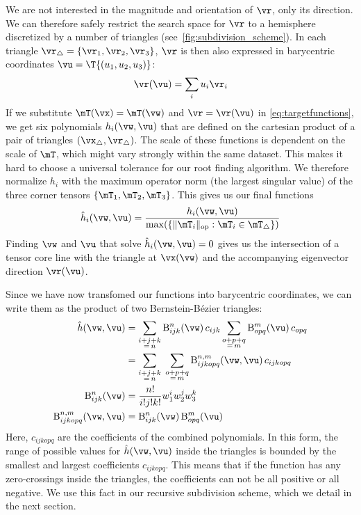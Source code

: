 %
We are not interested in the magnitude and orientation of $\vr$, only its
direction.
%
We can therefore safely restrict the search space for $\vr$ to a hemisphere
discretized by a number of triangles (see~\cref{fig:subdivision_scheme}).
%
In each triangle $\vr_\triangle = \{\vr_1, \vr_2, \vr_3\}$, $\vr$ is then also
expressed in barycentric coordinates $\vu = \T{(u_1, u_2, u_3)}$:
%
\begin{equation}
  \vr(\vu) = \sum_i u_i \vr_i
\end{equation}
%
If we substitute $\mT(\vx) = \mT(\vw)$ and $\vr = \vr(\vu)$ in
\eqref{eq:targetfunctions}, we get six polynomials $h_i(\vw, \vu)$
that are defined on the cartesian product of a pair of triangles
$(\vx_\triangle, \vr_\triangle)$.
%
The scale of these functions is dependent on the scale of $\mT$, which might
vary strongly within the same dataset.
%
This makes it hard to choose a universal tolerance for our root finding
algorithm.
%
We therefore normalize $h_i$ with the maximum operator norm (the largest
singular value) of the three corner tensors $\{\mT_1, \mT_2, \mT_3\}$.
%
This gives us our final functions
%
\begin{equation}
  \hat{h}_i(\vw, \vu) = \frac{h_i(\vw, \vu)}
      {\max(\{\|\mT_i\|_{\mathrm{op}} : \mT_i \in \mT_\triangle\})}
\end{equation}
%
Finding $\vw$ and $\vu$ that solve $\hat{h}_i(\vw, \vu) = 0$ gives us the
intersection of a tensor core line with the triangle at $\vx(\vw)$ and the
accompanying eigenvector direction $\vr(\vu)$.
%

%
Since we have now transfomed our functions into barycentric coordinates, we can
write them as the product of two Bernstein-B\'ezier triangles:
%
\begin{align}
\hat{h}(\vw, \vu) &= \sum_{\substack{i+j+k\\=\,n}} \mathrm{B}_{ijk}^n(\vw)\, c_{ijk}
                \sum_{\substack{o+p+q\\=\,m}} \mathrm{B}_{opq}^m(\vu)\, c_{opq} \\
            &= \sum_{\substack{i+j+k\\=\,n}} \; \sum_{\substack{o+p+q\\=\,m}}
              \mathrm{B}_{ijkopq}^{n, m}(\vw, \vu)\, c_{ijkopq} \\
\mathrm{B}_{ijk}^n(\vw) &= \frac{n!}{i!j!k!} w_1^i w_2^j w_3^k \\
\mathrm{B}_{ijkopq}^{n, m}(\vw, \vu) &= \mathrm{B}_{ijk}^n(\vw) \, \mathrm{B}_{opq}^m(\vu)
\end{align}
%
Here, $c_{ijkopq}$ are the coefficients of the combined polynomials.
%
In this form, the range of possible values for $\hat{h}(\vw, \vu)$ inside the
triangles is bounded by the smallest and largest coefficients $c_{ijkopq}$.
%
This means that if the function has any zero-crossings inside the triangles,
the coefficients can not be all positive or all negative.
%
We use this fact in our recursive subdivision scheme, which we detail in the
next section.
% 

